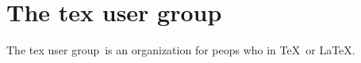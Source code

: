 \documentclass{article}
\newcommand{\TUG}{tex user group}
\begin{document}
\section{The \TUG}
The \TUG\ is an organization for peops who in \TeX\ or \LaTeX.
\end{document}
